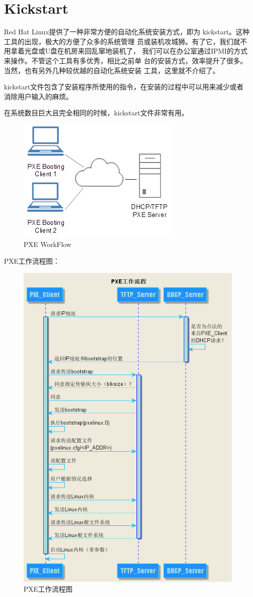 \chapter{Kickstart}

Red Hat Linux提供了一种非常方便的自动化系统安装方式，即为
kickstart。这种工具的出现，极大的方便了众多的系统管理
员或装机攻城狮。有了它，我们就不用拿着光盘或U盘在机房来回乱窜地装机了，
我们可以在办公室通过IPMI的方式来操作。不管这个工具有多优秀，相比之前单
台的安装方式，效率提升了很多。当然，也有另外几种较优越的自动化系统安装
工具，这里就不介绍了。

kickstart文件包含了安装程序所使用的指令，在安装的过程中可以用来减少或者
消除用户输入的麻烦。

在系统数目巨大且完全相同的时候，kickstart文件非常有用。


\begin{figure}[htbp]
  \begin{center}
    \includegraphics[width=.5\textwidth]{img/PXE_diagram.png}
  \end{center}
  \caption{PXE WorkFlow}
  \label{fig:pxeWork}
\end{figure}

PXE工作流程图：
\begin{figure}[htbp]
  \begin{center}
    \includegraphics[width=.55\textwidth]{img/pxe01.png}
  \end{center}
  \caption{PXE工作流程图}
  \label{fig:pxeWorkFlow}
\end{figure}

